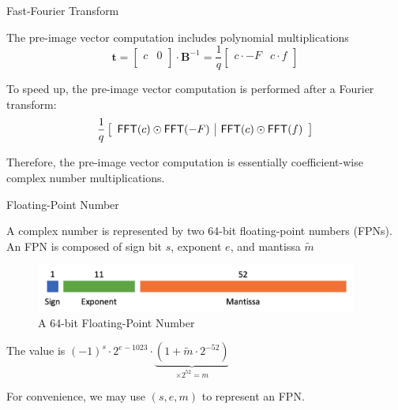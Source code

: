 \begin{frame}{Fast-Fourier Transform}

The pre-image vector computation includes polynomial multiplications
\[
\textbf{t} = \left[ \begin{array}{c|c} c & 0 \\ \end{array} \right] \cdot \mathbf{B}^{-1}
= \frac{1}{q} \left[ \begin{array}{c|c} c \cdot -F & c \cdot f \\ \end{array} \right]
\]
\pause

To speed up, the pre-image vector computation is performed after a Fourier transform:
\[
\frac{1}{q} \left[ \begin{array}{c|c} {\sf FFT}(c) \odot {\sf FFT}(-F) & {\sf FFT}(c) \odot {\sf FFT}(f) \end{array} \right]
\]
\pause

Therefore, the pre-image vector computation is essentially coefficient-wise complex number multiplications.

\end{frame}


\begin{frame}{Floating-Point Number}

A complex number is represented by two 64-bit floating-point numbers (FPNs). An FPN is composed of sign bit $s$, exponent $e$, and mantissa $\tilde{m}$

\begin{figure}
    \centering
    \includegraphics[width = 300pt]{Figure/fpu.png}
    \caption{A 64-bit Floating-Point Number}
    \label{fig:64bitfpr}
\end{figure}

The value is $(-1)^s \cdot 2^{e - 1023} \cdot \underbrace{(1 + \tilde{m} \cdot 2^{-52})}_{\times 2^{52} = m}$

For convenience, we may use $(s, e, m)$ to represent an FPN.

\end{frame}


